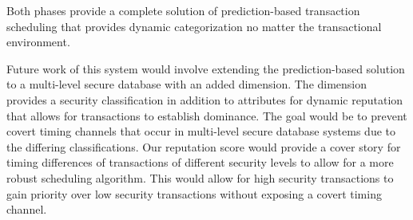 Both phases provide a complete solution of prediction-based transaction scheduling that provides dynamic categorization no matter the transactional environment. 

Future work of this system would involve extending the prediction-based solution to a multi-level secure database with an added dimension. The dimension provides a security classification in addition to attributes for dynamic reputation that allows for transactions to establish dominance. The goal would be to prevent covert timing channels that occur in  multi-level secure database systems due to the differing classifications. Our reputation score would provide a cover story for timing differences of transactions of different security levels to allow for a more robust scheduling algorithm. This would allow for high security transactions to gain priority over low security transactions without exposing a covert timing channel.

